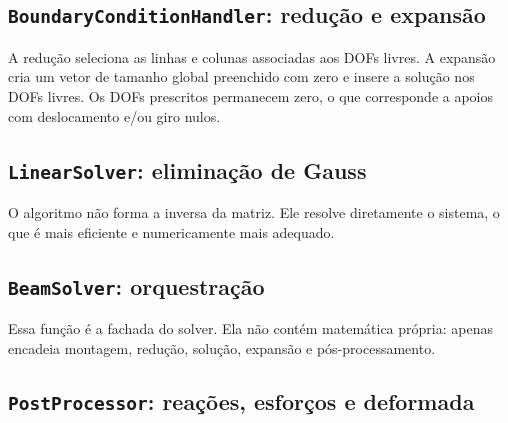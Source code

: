 \documentclass[12pt,a4paper]{article}
\begin{document}
\subsection{\texttt{BoundaryConditionHandler}: redução e expansão}





A redução seleciona as linhas e colunas associadas aos DOFs livres. A expansão cria um vetor de tamanho global preenchido com zero e insere a solução nos DOFs livres. Os DOFs prescritos permanecem zero, o que corresponde a apoios com deslocamento e/ou giro nulos.

\subsection{\texttt{LinearSolver}: eliminação de Gauss}



O algoritmo não forma a inversa da matriz. Ele resolve diretamente o sistema, o que é mais eficiente e numericamente mais adequado.

\subsection{\texttt{BeamSolver}: orquestração}



Essa função é a fachada do solver. Ela não contém matemática própria: apenas encadeia montagem, redução, solução, expansão e pós-processamento.

\subsection{\texttt{PostProcessor}: reações, esforços e deformada}
\end{document}
